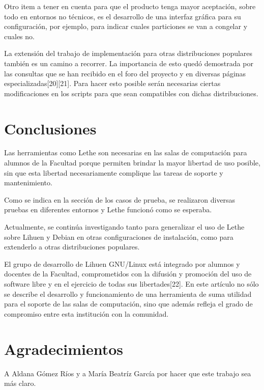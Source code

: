\documentclass[final,narroweqnarray,inline,twoside]{ieee}
\newcommand{\itref}[1]{[{#1}]}
\begin{document}
Otro item a tener en cuenta para que el producto tenga mayor aceptación, sobre todo en entornos no técnicos, es el desarrollo de una interfaz gráfica para su configuración, por ejemplo, para indicar cuales particiones se van a congelar y cuales no.

La extensión del trabajo de implementación para otras distribuciones populares también es un camino a recorrer. La importancia de esto quedó demostrada por las consultas que se han recibido en el foro del proyecto y en diversas páginas especializadas\itref{20}\itref{21}. Para hacer esto posible serán necesarias ciertas modificaciones en los scripts para que sean compatibles con dichas distribuciones.


\section{Conclusiones}

Las herramientas como Lethe son necesarias en las salas de computación para alumnos de la Facultad porque permiten brindar la mayor libertad de uso posible, sin que esta libertad necesariamente complique las tareas de soporte y mantenimiento.

Como se indica en la sección de los casos de prueba, se realizaron diversas pruebas en diferentes entornos y Lethe funcionó como se esperaba.

Actualmente, se continúa investigando tanto para generalizar el uso de Lethe sobre Lihuen y Debian en otras configuraciones de instalación, como para extenderlo a otras distribuciones populares.

El grupo de desarrollo de Lihuen GNU/Linux está integrado por alumnos y docentes de la Facultad, comprometidos con la difusión y promoción del uso de software libre y en el ejercicio de todas sus libertades\itref{22}. En este artículo no sólo se describe el desarrollo y funcionamiento de una herramienta de suma utilidad para el soporte de las salas de computación, sino que además refleja el grado de compromiso entre esta institución con la comunidad.

\section{Agradecimientos}
A Aldana Gómez Ríos y a María Beatríz García por hacer que este trabajo sea más claro.
\end{document}
